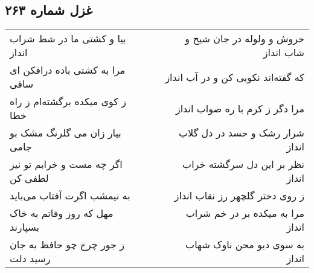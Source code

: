 \begin{center}
\section*{غزل شماره ۲۶۳}
\label{sec:sh263}
\begin{longtable}{l p{0.5cm} r}
بیا و کشتی ما در شط شراب انداز
&&
خروش و ولوله در جان شیخ و شاب انداز
\\
مرا به کشتی باده درافکن ای ساقی
&&
که گفته‌اند نکویی کن و در آب انداز
\\
ز کوی میکده برگشته‌ام ز راه خطا
&&
مرا دگر ز کرم با ره صواب انداز
\\
بیار زان می گلرنگ مشک بو جامی
&&
شرار رشک و حسد در دل گلاب انداز
\\
اگر چه مست و خرابم تو نیز لطفی کن
&&
نظر بر این دل سرگشته خراب انداز
\\
به نیمشب اگرت آفتاب می‌باید
&&
ز روی دختر گلچهر رز نقاب انداز
\\
مهل که روز وفاتم به خاک بسپارند
&&
مرا به میکده بر در خم شراب انداز
\\
ز جور چرخ چو حافظ به جان رسید دلت
&&
به سوی دیو محن ناوک شهاب انداز
\\
\end{longtable}
\end{center}
